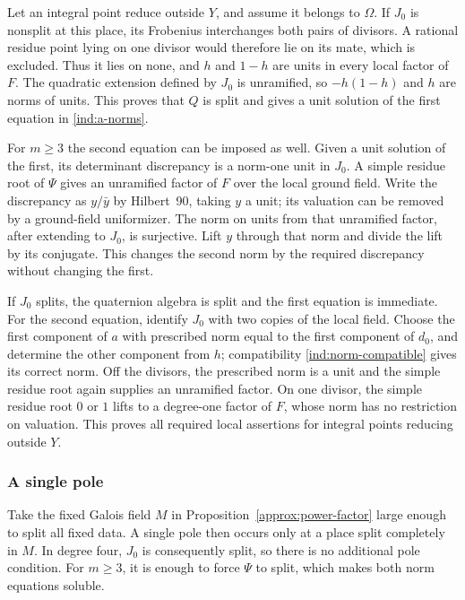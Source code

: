 Let an integral point reduce outside $Y$, and assume it belongs to
$\Omega$.  If $J_0$ is nonsplit at this place, its Frobenius interchanges
both pairs of divisors.  A rational residue point lying on one divisor
would therefore lie on its mate, which is excluded.  Thus it lies on
none, and $h$ and $1-h$ are units in every local factor of $F$.  The
quadratic extension defined by $J_0$ is unramified, so $-h(1-h)$ and
$h$ are norms of units.  This proves that $Q$ is split and gives a unit
solution of the first equation in \eqref{ind:a-norms}.

For $m\geq3$ the second equation can be imposed as well.  Given a unit
solution of the first, its determinant discrepancy is a norm-one unit
in $J_0$.  A simple residue root of $\Psi$ gives an unramified factor of
$F$ over the local ground field.  Write the discrepancy as $y/\bar y$
by Hilbert~90, taking $y$ a unit; its valuation can be removed by a
ground-field uniformizer.  The norm on units from that unramified
factor, after extending to $J_0$, is surjective.  Lift $y$ through that
norm and divide the lift by its conjugate.  This changes the second
norm by the required discrepancy without changing the first.

If $J_0$ splits, the quaternion algebra is split and the first equation
is immediate.  For the second equation, identify $J_0$ with two copies
of the local field.  Choose the first component of $a$ with prescribed
norm equal to the first component of $d_0$, and determine the other
component from $h$; compatibility \eqref{ind:norm-compatible} gives its
correct norm.  Off the divisors, the prescribed norm is a unit and the
simple residue root again supplies an unramified factor.  On one
divisor, the simple residue root $0$ or $1$ lifts to a degree-one factor
of $F$, whose norm has no restriction on valuation.  This proves all
required local assertions for integral points reducing outside $Y$.

\subsubsection{A single pole}

Take the fixed Galois field $M$ in
Proposition~\ref{approx:power-factor} large enough to split all fixed
data.  A single pole then occurs only at a place split completely in
$M$.  In degree four, $J_0$ is consequently split, so there is no
additional pole condition.  For $m\geq3$, it is enough to force $\Psi$
to split, which makes both norm equations soluble.

